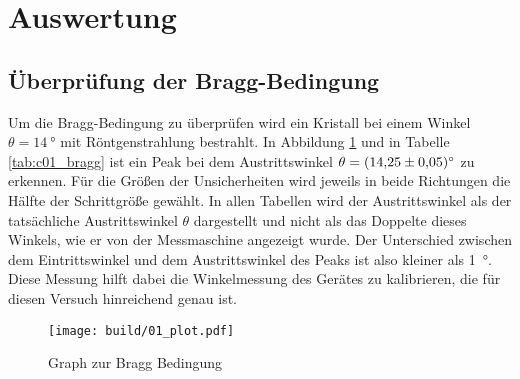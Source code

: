 \section{Auswertung}
\subsection{Überprüfung der Bragg-Bedingung}
Um die Bragg-Bedingung zu überprüfen wird ein Kristall bei einem Winkel $\theta = \qty{14}{\degree}$ mit Röntgenstrahlung bestrahlt.
In Abbildung \ref{fig:01} und in Tabelle \ref{tab:c01_bragg} ist ein Peak bei dem Austrittswinkel $\theta= \qty{14.25+-0.05}{\degree}$
zu erkennen. 
Für die Größen der Unsicherheiten wird jeweils in beide Richtungen die Hälfte der Schrittgröße gewählt.
In allen Tabellen wird der Austrittswinkel als der tatsächliche Austrittswinkel $\theta$ dargestellt und nicht als das 
Doppelte dieses Winkels, wie er von der Messmaschine angezeigt wurde.
Der Unterschied zwischen dem Eintrittswinkel und dem Austrittswinkel des Peaks ist also kleiner als \qty{1}{\degree}.
Diese Messung hilft dabei die Winkelmessung des Gerätes zu kalibrieren, die für diesen Versuch hinreichend genau ist.
\begin{figure}
    \centering
    \texttt{[image: build/01\_plot.pdf]}
    \caption{Graph zur Bragg Bedingung}
    \label{fig:01}
\end{figure}

